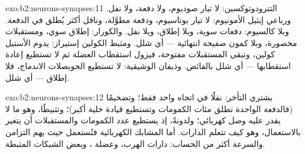 \begin{solution}{exo:b2:neurons-synapses:11}
التترودوتوكسين: لا تيار صوديوم، ولا دفعة، ولا نقل.
ورباعي إيثيل الأمونيوم: لا تيار بوتاسيوم، ودفعة مطوَّلة، وناقل
أكثر يُطلق في الدفعة. وبلا كالسيوم: دفعات سوية،
وبلا إطلاق، وبلا نقل. والكورار: إطلاق سوي، ومستقبلات
محصورة، وبلا كمون صفيحة انتهائية --- أي شلل. ومثبط
الكولين إستيراز: يدوم الأستيل كولين، وتبقى المستقبلات مفتوحة، فيزول استقطاب
العضلة ثم لا تستطيع إعادة استقطابها --- أي شلل بالفائض.
وذيفان الوشيقية: لا تستطيع الحويصلات الاندماج، فلا إطلاق --- أي شلل.
\end{solution}

\begin{solution}{exo:b2:neurons-synapses:12}
يشتري التأخر: نقلًا في اتجاه واحد فقط؛ وتضخيمًا
(فالدفعة الواحدة تطلق مئات الكمومات وتستطيع قيادة
خلية أكبر)؛ وتثبيطًا، وهو ما لا يقدر عليه وصل كهربائي؛
ولدونةً، إذ يستطيع عدد الكمومات والمستقبلات أن يتغير
بالاستعمال، وهو كيف تتعلم الدارات. أما المشابك الكهربائية فتُستعمل
حيث يهم التزامن والسرعة أكثر من الحساب:
دارات الهرب، وعضلة ، وبعض الشبكات المثبطة.
\end{solution}

